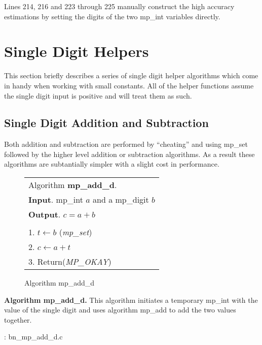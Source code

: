 \documentclass[b5paper]{book}
\begin{document}
Lines 214, 216 and 223 through 225 manually construct the high accuracy estimations by setting the digits of the two mp\_int 
variables directly.  

\section{Single Digit Helpers}

This section briefly describes a series of single digit helper algorithms which come in handy when working with small constants.  All of 
the helper functions assume the single digit input is positive and will treat them as such.

\subsection{Single Digit Addition and Subtraction}

Both addition and subtraction are performed by ``cheating'' and using mp\_set followed by the higher level addition or subtraction 
algorithms.   As a result these algorithms are subtantially simpler with a slight cost in performance.

\newpage\begin{figure}[!here]
\begin{small}
\begin{center}
\begin{tabular}{l}
\hline Algorithm \textbf{mp\_add\_d}. \\
\textbf{Input}.   mp\_int $a$ and a mp\_digit $b$ \\
\textbf{Output}.  $c = a + b$ \\
\hline \\
1.  $t \leftarrow b$ (\textit{mp\_set}) \\
2.  $c \leftarrow a + t$ \\
3.  Return(\textit{MP\_OKAY}) \\
\hline
\end{tabular}
\end{center}
\end{small}
\caption{Algorithm mp\_add\_d}
\end{figure}

\textbf{Algorithm mp\_add\_d.}
This algorithm initiates a temporary mp\_int with the value of the single digit and uses algorithm mp\_add to add the two values together.

\vspace{+3mm}\begin{small}
\hspace{-5.1mm}{\bf File}: bn\_mp\_add\_d.c
\vspace{-3mm}
\begin{alltt}
\end{alltt}
\end{small}
\end{document}
